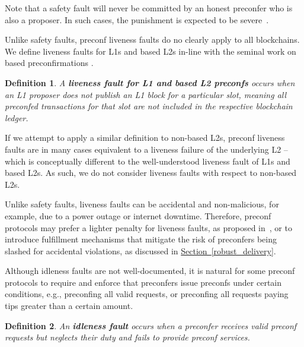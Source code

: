 \documentclass[a4paper]{article}
\theoremstyle{boldstyle}
\newtheorem{definitionx}{Definition}
\newenvironment{definition}
  {\begin{defopenboxq}\begin{definitionx}}
  {\end{definitionx}\end{defopenboxq}}
\begin{document}
    \par
    Note that a safety fault will never be committed by an honest preconfer who is also a proposer. In such cases, the punishment is expected to be severe~\cite{W:Basedpreconfirmations}.
    
    Unlike safety faults, preconf liveness faults do no clearly apply to all blockchains. We define liveness faults for L1s and based L2s in-line with the seminal work on based preconfirmations \cite{W:Basedpreconfirmations}.
    
        \begin{definition}
            \label{def:liveness_fault}
            A \textbf{liveness fault for L1 and based L2 preconfs} occurs when an L1 proposer does not publish an L1 block for a particular slot, meaning all preconfed transactions for that slot are not included in the respective blockchain ledger.
        \end{definition}

         If we attempt to apply a similar definition to non-based L2s, preconf liveness faults are in many cases equivalent to a liveness failure of the underlying L2 -- which is conceptually different to the well-understood liveness fault of L1s and based L2s. As such, we do not consider liveness faults with respect to non-based L2s. 
         
         Unlike safety faults, liveness faults can be accidental and non-malicious, for example, due to a power outage or internet downtime. Therefore, preconf protocols may prefer a lighter penalty for liveness faults, as proposed in~\cite{W:Basedpreconfirmations}, or to introduce fulfillment mechanisms that mitigate the risk of preconfers being slashed for accidental violations, as discussed in \hyperref[robust_delivery]{Section~\ref{robust_delivery}}.     

     Although idleness faults are not well-documented, it is natural for some preconf protocols to require and enforce that preconfers issue preconfs under certain conditions, e.g., preconfing all valid requests, or preconfing all requests paying tips greater than a certain amount.
        \begin{definition}
            An \textbf{idleness fault} occurs when a preconfer receives valid preconf requests but neglects their duty and fails to provide preconf services.
        \end{definition}
      
\end{document}
